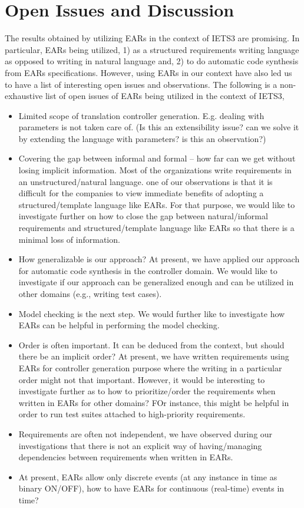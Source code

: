 \section{Open Issues and Discussion}
The results obtained by utilizing EARs in the context of IETS3 are
promising. In particular, EARs being utilized, 1) as a structured
requirements writing language as opposed to writing in natural language and, 2)
to do automatic code synthesis from EARs specifications. However, using EARs in
our context have also led us to have a list of interesting open issues and
observations.
The following is a non-exhaustive list of open issues of EARs
being utilized in the context of IETS3,
\begin{itemize}
  \item Limited scope of translation controller generation. E.g. dealing with
  parameters is not taken care of. (Is this an extensibility issue? can we
  solve it by extending the language with parameters? is this an observation?)
  \item Covering the gap between informal and formal -- how far can we get
  without losing implicit information. Most of the organizations write
  requirements in an unstructured/natural language. one of our
  observations is that it is difficult for the companies to view immediate
  benefits of adopting a structured/template language like EARs. For that
  purpose, we would like to investigate further on how to close the gap between
  natural/informal requirements and structured/template language like EARs so
  that there is a minimal loss of information.
  \item How generalizable is our approach? At present, we have applied our
  approach for automatic code synthesis in the controller domain. We would like to investigate if our approach can
  be generalized enough and can be utilized in other domains (e.g., writing test
  cases).
  \item Model checking is the next step. We would further like to investigate
  how EARs can be helpful in performing the model checking.
  \item Order is often important. It can be deduced from the context, but should
  there be an implicit order? At present, we have written requirements using
  EARs for controller generation purpose where the writing in a particular order might not that
  important. However, it would be interesting to investigate further as to how
  to prioritize/order the requirements when written in EARs for other domains?
  FOr instance, this might be helpful in order to run test suites attached to
  high-priority requirements.
  \item Requirements are often not independent, we have observed during our
  investigations that there is not an explicit way of having/managing
  dependencies between requirements when written in EARs.
  \item At present, EARs allow only discrete events (at any instance in time
  as binary ON/OFF), how to have EARs for continuous (real-time) events in time? 
\end{itemize}